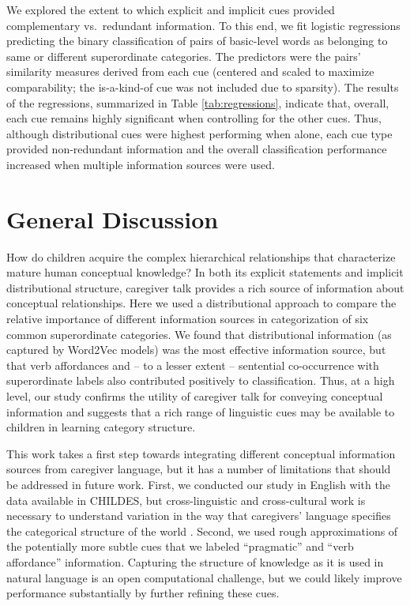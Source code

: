 \documentclass[10pt, letterpaper]{article}
\begin{document}
We explored the extent to which explicit and implicit cues provided
complementary vs.~redundant information. To this end, we fit logistic
regressions predicting the binary classification of pairs of basic-level
words as belonging to same or different superordinate categories. The
predictors were the pairs' similarity measures derived from each cue (centered and scaled to maximize comparability; the is-a-kind-of cue was not included due to sparsity). The results of the regressions,
summarized in Table \ref{tab:regressions}, indicate that, overall, each cue remains highly significant when controlling for the other cues. Thus, although distributional cues were highest performing when alone, each cue type provided non-redundant information and the overall classification performance increased when multiple information sources were used.

\hypertarget{general-discussion}{%
\section{General Discussion}\label{general-discussion}}

How do children acquire the complex hierarchical relationships that characterize mature human conceptual knowledge? In both its explicit statements and implicit distributional structure, caregiver talk provides a rich source of information about conceptual relationships. Here we used a distributional approach to compare the relative importance of different information sources in categorization of six common superordinate categories. We found that distributional information (as captured by Word2Vec models) was the most effective information source, but that verb affordances and -- to a lesser extent -- sentential co-occurrence with superordinate labels also contributed positively to classification. Thus, at a high level, our study confirms the utility of caregiver talk for conveying conceptual information and suggests that a rich range of linguistic cues may be available to children in learning category structure.

This work takes a first step towards integrating different conceptual information sources from caregiver language, but it has a number of limitations that should be addressed in future work. First, we conducted our study in English with the data available in CHILDES, but cross-linguistic and cross-cultural work is necessary to understand variation in the way that caregivers' language specifies the categorical structure of the world \cite{medin2010}. Second, we used rough approximations of the potentially more subtle cues that we labeled ``pragmatic'' and ``verb affordance'' information. Capturing the structure of knowledge as it is used in natural language is an open computational challenge, but we could likely improve performance substantially by further refining these cues.
\end{document}
